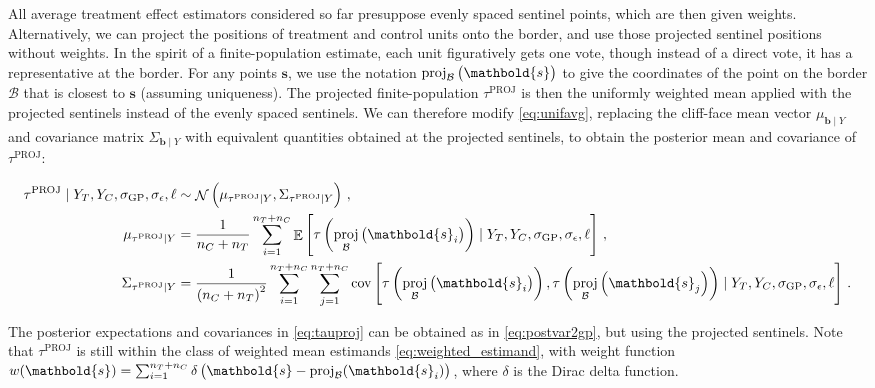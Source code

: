 \documentclass[letter]{article}
\DeclareMathOperator{\E}{\mathbb{E}}
\DeclareMathOperator{\cov}{{cov}}
\DeclareMathOperator{\normal}{\mathcal{N}}
\newcommand{\sigmaf}{\sigma_{\mathrm{GP}}}
\newcommand{\sigman}{\sigma_{\epsilon}}
\newcommand{\svec}{\mathbold{s}}
\newcommand{\boundary}{\mathcal{B}}
\newcommand{\sentinels}{\bm{b}}
\newcommand{\tauproj}{\tau^{\mathrm{PROJ}}}
\newcommand{\eqlabel}[1]{\label{#1}}
\DeclareMathOperator{\proj}{proj}
\begin{document}
All average treatment effect estimators considered so far presuppose evenly spaced sentinel points, which are then given weights.
Alternatively, we can project the positions of treatment and control units onto the border, and use those projected sentinel positions without weights.
In the spirit of a finite-population estimate, each unit figuratively gets one vote, though instead of a direct vote, it has a representative at the border.
For any points \(\svec\), we use the notation \(\proj_{\boundary}\del{\svec}\) to give the coordinates of the point on the border \(\boundary\) that is closest to \(\svec\) (assuming uniqueness).
The projected finite-population \(\tauproj\) is then the uniformly weighted mean applied with the projected sentinels instead of the evenly spaced sentinels.
We can therefore modify \eqref{eq:unifavg}, replacing the cliff-face mean vector \(\mu_{\sentinels \mid Y}\)
and covariance matrix \(\Sigma_{\sentinels \mid Y}\)
with equivalent quantities obtained at the projected sentinels,
to obtain the posterior mean and covariance of \(\tauproj\):

\begin{equation}\begin{split}
    \tauproj \mid Y_T, Y_C, \sigmaf, \sigman, \ell &\sim \normal\del{\mu_{\tauproj \mid Y}, \Sigma_{\tauproj \mid Y}}\,, \\
    \mu_{\tauproj \mid Y} &= \frac{1}{n_C + n_T} \sum_{i=1}^{n_T+n_C} 
        \E\sbr{
            \tau\del{
                \proj_{\boundary}\del{\svec_i}
            }
            \mid Y_T, Y_C, \sigmaf, \sigman, \ell
         } \,,\\
    \Sigma_{\tauproj \mid Y} &= \frac{1}{\del{n_C + n_T}^2}
        \sum_{i=1}^{n_T+n_C} 
        \sum_{j=1}^{n_T+n_C} 
        \cov\sbr{
            \tau\del{
                \proj_{\boundary}\del{\svec_i}
            },
            \tau\del{
                \proj_{\boundary}\del{\svec_j}
            }
            \mid Y_T, Y_C, \sigmaf, \sigman, \ell
        }\,.
\end{split}
\eqlabel{eq:tauproj}
\end{equation}

The posterior expectations and covariances in \eqref{eq:tauproj} can be obtained as in \eqref{eq:postvar2gp}, but using the projected sentinels.
Note that \(\tauproj\) is still within the class of weighted mean estimands \eqref{eq:weighted_estimand},
with weight function \(w(\svec) = \sum_{i=1}^{n_T+n_C} \delta\del{ \svec - \proj_\boundary(\svec_i)}\), where \(\delta\) is the Dirac delta function.
\end{document}

